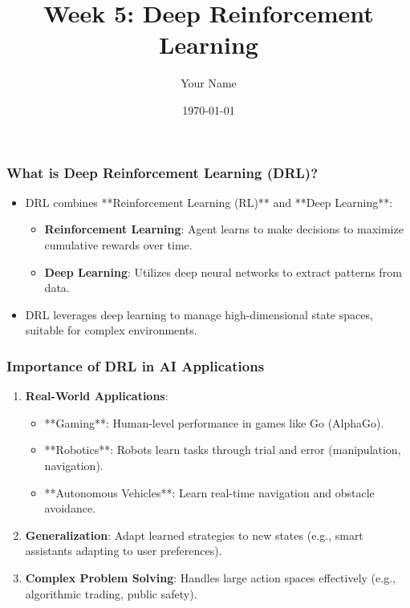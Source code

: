 \documentclass[aspectratio=169]{beamer}
\title[Deep Reinforcement Learning]{Week 5: Deep Reinforcement Learning}
\author[Your Name]{Your Name}
\institute[Your Institute]{
  Your Institute\\
  \vspace{0.3cm}
  Email: youremail@institute.edu\\
  Website: www.institute.edu
}
\date{\today}
\begin{document}
\frame{\titlepage}

\begin{frame}[fragile]
    \titlepage
\end{frame}

\begin{frame}[fragile]
    \frametitle{What is Deep Reinforcement Learning (DRL)?}
    \begin{itemize}
        \item DRL combines **Reinforcement Learning (RL)** and **Deep Learning**:
            \begin{itemize}
                \item \textbf{Reinforcement Learning}: Agent learns to make decisions to maximize cumulative rewards over time.
                \item \textbf{Deep Learning}: Utilizes deep neural networks to extract patterns from data.
            \end{itemize}
        \item DRL leverages deep learning to manage high-dimensional state spaces, suitable for complex environments.
    \end{itemize}
\end{frame}

\begin{frame}[fragile]
    \frametitle{Importance of DRL in AI Applications}
    \begin{enumerate}
        \item \textbf{Real-World Applications}:
            \begin{itemize}
                \item **Gaming**: Human-level performance in games like Go (AlphaGo).
                \item **Robotics**: Robots learn tasks through trial and error (manipulation, navigation).
                \item **Autonomous Vehicles**: Learn real-time navigation and obstacle avoidance.
            \end{itemize}
        \item \textbf{Generalization}: Adapt learned strategies to new states (e.g., smart assistants adapting to user preferences).
        \item \textbf{Complex Problem Solving}: Handles large action spaces effectively (e.g., algorithmic trading, public safety).
    \end{enumerate}
\end{frame}
\end{document}
